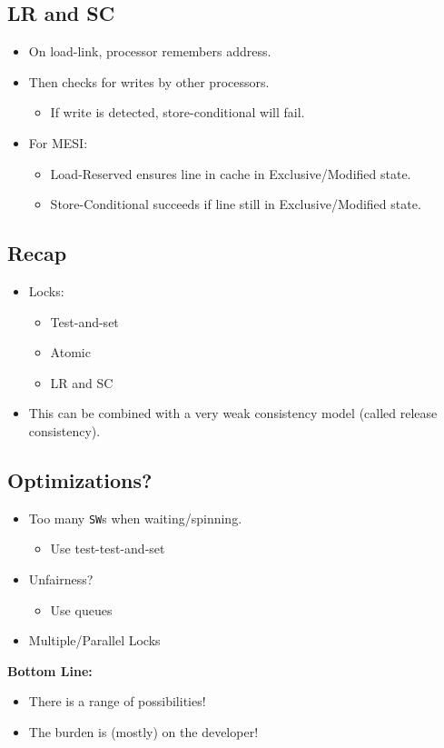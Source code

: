 \documentclass[10pt]{article}
\begin{document}
\subsection*{LR and SC}
\begin{itemize}
    \item On load-link, processor remembers address.
    \item Then checks for writes by other processors.
    \begin{itemize}
        \item If write is detected, store-conditional will fail.
    \end{itemize}
    \item For MESI:
    \begin{itemize}
        \item Load-Reserved ensures line in cache in Exclusive/Modified state.
        \item Store-Conditional succeeds if line still in Exclusive/Modified state.
    \end{itemize}
\end{itemize}

\subsection*{Recap}
\begin{itemize}
    \item Locks:
    \begin{itemize}
        \item Test-and-set
        \item Atomic
        \item LR and SC
    \end{itemize}
    \item This can be combined with a very weak consistency model (called release consistency).
\end{itemize}

\subsection*{Optimizations?}
\begin{itemize}
    \item Too many \texttt{SW}s when waiting/spinning.
    \begin{itemize}
        \item Use test-test-and-set
    \end{itemize}
    \item Unfairness?
    \begin{itemize} 
        \item Use queues
    \end{itemize}
    \item Multiple/Parallel Locks
\end{itemize}
\textbf{Bottom Line:}
\begin{itemize}
    \item There is a range of possibilities!
    \item The burden is (mostly) on the developer!
\end{itemize}
\end{document}
